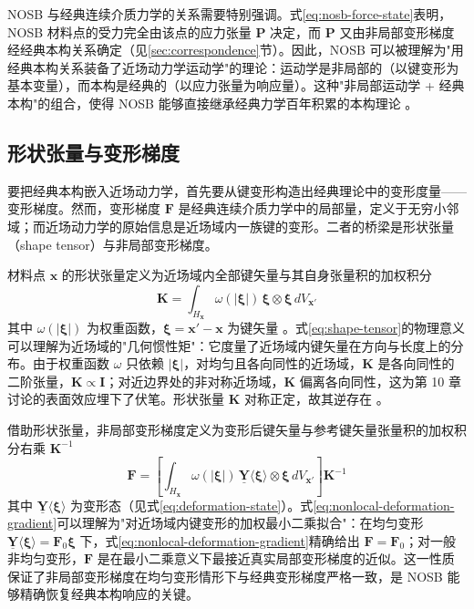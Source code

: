 \begin{remark}
  NOSB 与经典连续介质力学的关系需要特别强调。式\eqref{eq:nosb-force-state}表明，NOSB 材料点的受力完全由该点的应力张量 $\mathbf{P}$ 决定，而 $\mathbf{P}$ 又由非局部变形梯度经经典本构关系确定（见\ref{sec:correspondence}节）。因此，NOSB 可以被理解为"用经典本构关系装备了近场动力学运动学"的理论：运动学是非局部的（以键变形为基本变量），而本构是经典的（以应力张量为响应量）。这种"非局部运动学 + 经典本构"的组合，使得 NOSB 能够直接继承经典力学百年积累的本构理论 \cite{Silling2007,SillingLehoucq2010}。
\end{remark}

\subsection{形状张量与变形梯度}\label{sec:shape-tensor}

要把经典本构嵌入近场动力学，首先要从键变形构造出经典理论中的变形度量——变形梯度。然而，变形梯度 $\mathbf{F}$ 是经典连续介质力学中的局部量，定义于无穷小邻域；而近场动力学的原始信息是近场域内一族键的变形。二者的桥梁是形状张量（shape tensor）与非局部变形梯度。

材料点 $\mathbf{x}$ 的形状张量定义为近场域内全部键矢量与其自身张量积的加权积分
\begin{equation}
  \mathbf{K}=\int_{H_{\mathbf{x}}}\omega(|\boldsymbol{\xi}|)\,\boldsymbol{\xi}\otimes\boldsymbol{\xi}\,dV_{\mathbf{x}'}
  \label{eq:shape-tensor}
\end{equation}
其中 $\omega(|\boldsymbol{\xi}|)$ 为权重函数，$\boldsymbol{\xi}=\mathbf{x}'-\mathbf{x}$ 为键矢量 \cite{Silling2007}。式\eqref{eq:shape-tensor}的物理意义可以理解为近场域的"几何惯性矩"：它度量了近场域内键矢量在方向与长度上的分布。由于权重函数 $\omega$ 只依赖 $|\boldsymbol{\xi}|$，对均匀且各向同性的近场域，$\mathbf{K}$ 是各向同性的二阶张量，$\mathbf{K}\propto\mathbf{I}$；对近边界处的非对称近场域，$\mathbf{K}$ 偏离各向同性，这为第 10 章讨论的表面效应埋下了伏笔。形状张量 $\mathbf{K}$ 对称正定，故其逆存在 \cite{Silling2007}。

借助形状张量，非局部变形梯度定义为变形后键矢量与参考键矢量张量积的加权积分右乘 $\mathbf{K}^{-1}$
\begin{equation}
  \mathbf{F}=\left[\int_{H_{\mathbf{x}}}\omega(|\boldsymbol{\xi}|)\,
  \underline{\mathbf{Y}}\langle\boldsymbol{\xi}\rangle\otimes\boldsymbol{\xi}\,dV_{\mathbf{x}'}\right]\mathbf{K}^{-1}
  \label{eq:nonlocal-deformation-gradient}
\end{equation}
其中 $\underline{\mathbf{Y}}\langle\boldsymbol{\xi}\rangle$ 为变形态（见式\eqref{eq:deformation-state}）\cite{Silling2007}。式\eqref{eq:nonlocal-deformation-gradient}可以理解为"对近场域内键变形的加权最小二乘拟合"：在均匀变形 $\underline{\mathbf{Y}}\langle\boldsymbol{\xi}\rangle=\mathbf{F}_{0}\boldsymbol{\xi}$ 下，式\eqref{eq:nonlocal-deformation-gradient}精确给出 $\mathbf{F}=\mathbf{F}_{0}$；对一般非均匀变形，$\mathbf{F}$ 是在最小二乘意义下最接近真实局部变形梯度的近似。这一性质保证了非局部变形梯度在均匀变形情形下与经典变形梯度严格一致，是 NOSB 能够精确恢复经典本构响应的关键。

